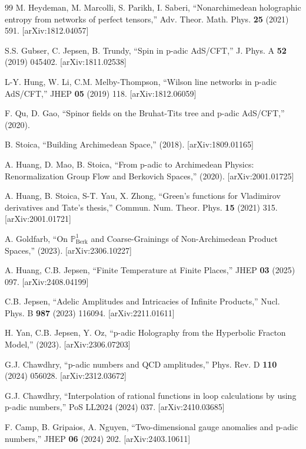 \documentclass[11pt,a4paper]{ctexart}
\theoremstyle{remark}
\begin{document}
\begin{thebibliography}{99}
 M. Heydeman, M. Marcolli, S. Parikh, I. Saberi, ``Nonarchimedean holographic entropy from networks of perfect tensors,'' Adv. Theor. Math. Phys. \textbf{25} (2021) 591. [arXiv:1812.04057]

 S.S. Gubser, C. Jepsen, B. Trundy, ``Spin in p-adic AdS/CFT,'' J. Phys. A \textbf{52} (2019) 045402. [arXiv:1811.02538]

 L-Y. Hung, W. Li, C.M. Melby-Thompson, ``Wilson line networks in p-adic AdS/CFT,'' JHEP \textbf{05} (2019) 118. [arXiv:1812.06059]

 F. Qu, D. Gao, ``Spinor fields on the Bruhat-Tits tree and p-adic AdS/CFT,'' (2020).


 B. Stoica, ``Building Archimedean Space,'' (2018). [arXiv:1809.01165]

 A. Huang, D. Mao, B. Stoica, ``From p-adic to Archimedean Physics: Renormalization Group Flow and Berkovich Spaces,'' (2020). [arXiv:2001.01725]

 A. Huang, B. Stoica, S-T. Yau, X. Zhong, ``Green's functions for Vladimirov derivatives and Tate's thesis,'' Commun. Num. Theor. Phys. \textbf{15} (2021) 315. [arXiv:2001.01721]

 A. Goldfarb, ``On $\mathbb{P}^1_{\text{Berk}}$ and Coarse-Grainings of Non-Archimedean Product Spaces,'' (2023). [arXiv:2306.10227]

 A. Huang, C.B. Jepsen, ``Finite Temperature at Finite Places,'' JHEP \textbf{03} (2025) 097. [arXiv:2408.04199]

 C.B. Jepsen, ``Adelic Amplitudes and Intricacies of Infinite Products,'' Nucl. Phys. B \textbf{987} (2023) 116094. [arXiv:2211.01611]


 H. Yan, C.B. Jepsen, Y. Oz, ``p-adic Holography from the Hyperbolic Fracton Model,'' (2023). [arXiv:2306.07203]

 G.J. Chawdhry, ``p-adic numbers and QCD amplitudes,'' Phys. Rev. D \textbf{110} (2024) 056028. [arXiv:2312.03672]

 G.J. Chawdhry, ``Interpolation of rational functions in loop calculations by using p-adic numbers,'' PoS LL2024 (2024) 037. [arXiv:2410.03685]

 F. Camp, B. Gripaios, A. Nguyen, ``Two-dimensional gauge anomalies and p-adic numbers,'' JHEP \textbf{06} (2024) 202. [arXiv:2403.10611]


\end{thebibliography}
\end{document}

